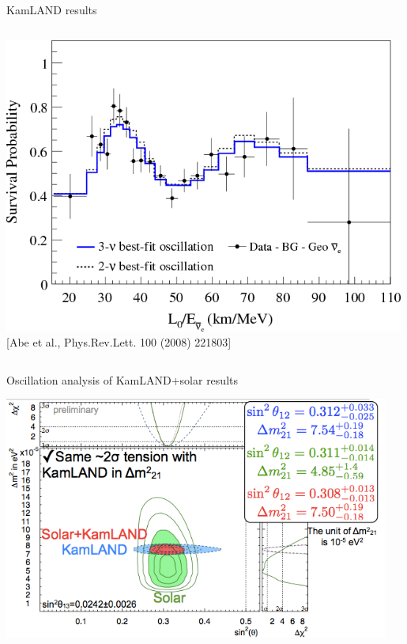 \begin{frame}[t]{KamLAND results}
\begin{columns}
\begin{column}{0.60\textwidth}
     \includegraphics[width=0.99\textwidth]{./images/3nu/reactor/kamLAND_oscillations.png}\\
     {\scriptsize \color{blue}[Abe et al., Phys.Rev.Lett. 100 (2008) 221803]}
  \end{column}
\end{columns}
\end{frame}


\begin{frame}[t]{Oscillation analysis of KamLAND+solar results}

\centering
\includegraphics[width=0.95\textwidth]{./images/3nu/solar/global_osc_results.png}\\
\end{frame}

